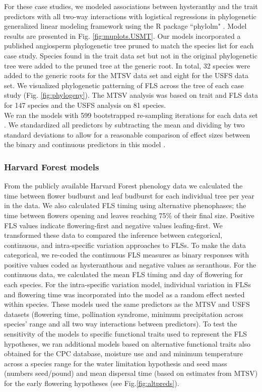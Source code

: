 \documentclass[11pt]{article}
\begin{document}
\noindent For these case studies, we modeled associations between hysteranthy and the trait predictors with all two-way interactions with logistical regressions in phylogenetic generalized linear modeling framework \citep{Ives2010} using the R package ``phylolm" \citep{Ho2014}. Model results are presented in Fig. \ref{fig:muplots.USMT}. Our models incorporated a published angiosperm phylogenetic tree \citep{Zanne2013} pruned to match the species list for each case study. Species found in the trait data set but not in the original phylogenetic tree were added to the pruned tree at the generic root. In total, 32 species were added to the generic roots for the MTSV data set and eight for the USFS data set. We visualized phylogenetic patterning of FLS across the tree of each case study (Fig. \ref{fig:phylogeny}). The MTSV analysis was based on trait and FLS data for 147 species and the USFS analysis on 81 species. \\

\noindent We ran the models with 599 bootstrapped re-sampling iterations for each data set \citep{Wilcox2010}. We standardized all predictors by subtracting the mean and dividing by two standard deviations to allow for a reasonable comparison of effect sizes between the binary and continuous predictors in this model \citep{Gelman2007}. 


\subsubsection*{Harvard Forest models}
\noindnent From the publicly available Harvard Forest phenology data \citep{OKeefe2015} we calculated the time between flower budburst and leaf budburst for each individual tree per year in the data. We also calculated FLS timing using alternative phenophases; the time between flowers opening and leaves reaching 75\% of their final size. Positive FLS values indicate flowering-first and negative values leafing-first. We transformed these data to compared the inference between categorical, continuous, and intra-specific variation approaches to FLSs. To make the data categorical, we re-coded the continuous FLS measures as binary responses with positive values coded as hysteranthous and negative values as seranthous. For the continuous data, we calculated the mean FLS timing and day of flowering for each species. For the intra-specific variation model, individual variation in FLSs and flowering time was incorporated into the model as a random effect nested within species. These models used the same predictors as the MTSV and USFS datasets (flowering time, pollination syndrome, minimum precipitation across species' range and all two way interactions between predictors). To test the sensitivity of the models to specific functional traits used to represent the FLS hypotheses, we ran additional models based on alternative functional traits also obtained for the CPC database\citep{usdancrs}, moisture use and and minimum temperature across a species range for the water limitation hypothesis and seed mass (numbers seed/pound) and mean dispersal time (based on estimates from MTSV) for the early flowering hypotheses (see Fig.\ref{fig:altpreds}).\\
\end{document}
